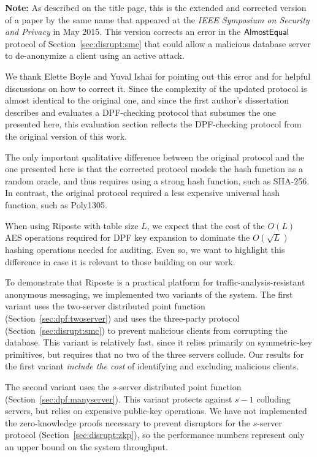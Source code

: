 \documentclass[10pt,twocolumn]{article}
\newcommand{\name}{Riposte\xspace}
\begin{document}
\begin{framed}
\noindent
{\color{blue} \textbf{Note:}}
As described on the title page, this is the extended and corrected
version of a paper by the same name that appeared at the
{\em IEEE Symposium on Security and Privacy}
in May 2015. This version corrects an error in the 
${\sf AlmostEqual}$ protocol of Section~\ref{sec:disrupt:smc}
that could allow a malicious database server to de-anonymize
a client using an active attack.

We thank Elette Boyle and Yuval Ishai for pointing out this
error and for helpful discussions on how to correct it.
Since the complexity of the updated protocol is almost identical
to the original one, and since the first author's 
dissertation~\cite[Section 5]{thesis} describes and evaluates
a DPF-checking protocol that subsumes the one
presented here, this evaluation section 
reflects the DPF-checking protocol from
the original version of this work.

The only important qualitative difference between the original
protocol and the one presented here is that the corrected protocol
models the hash function as a random oracle, and thus requires
using a strong hash function, such as SHA-256.
In contrast, the original protocol required a less expensive 
universal hash function, such as Poly1305.

When using Riposte with table size $L$,
we expect that the cost of the $O(L)$ AES operations required 
for DPF key expansion to dominate the $O(\sqrt L)$ hashing
operations needed for auditing.
Even so, we want to highlight this difference in case it
is relevant to those building on our work.
\end{framed}

To demonstrate that \name is a practical platform
for traffic-analysis-resistant anonymous messaging,
we implemented two variants of the system. 
The first variant uses the two-server distributed
point function (Section~\ref{sec:dpf:twoserver})
and uses the three-party protocol 
(Section~\ref{sec:disrupt:smc})
to prevent malicious clients from corrupting the database.
This variant is relatively fast, since it relies
primarily on symmetric-key primitives, but requires
that no two of the three servers collude.
Our results for the first variant {\em include the cost}
of identifying and excluding malicious clients.

The second variant uses the $s$-server distributed
point function (Section~\ref{sec:dpf:manyserver}).
This variant protects against $s-1$ colluding servers,
but relies on expensive public-key operations.
We have not implemented the zero-knowledge proofs
necessary to prevent disruptors for the $s$-server
protocol (Section~\ref{sec:disrupt:zkp}), so the
performance numbers represent only an upper bound on the
system throughput.
\end{document}
